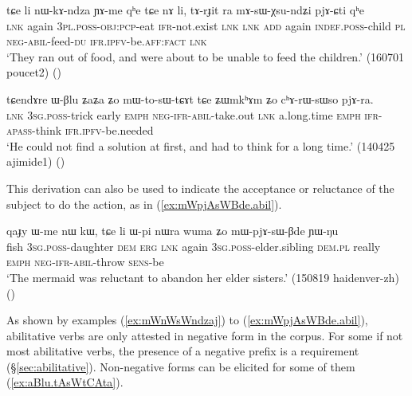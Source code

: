   \begin{exe}
\ex \label{ex:mAsWXsundZi}
 \gll   tɕe li nɯ-kɤ-ndza ɲɤ-me qʰe tɕe nɤ li, tɤ-rɟit ra mɤ-sɯ-χsu-ndʑi pjɤ-ɕti qʰe \\
 \textsc{lnk} again \textsc{3pl}.\textsc{poss}-\textsc{obj}:\textsc{pcp}-eat \textsc{ifr}-not.exist \textsc{lnk} \textsc{lnk} \textsc{add} again \textsc{indef}.\textsc{poss}-child \textsc{pl} \textsc{neg}-\textsc{abil}-feed-\textsc{du} \textsc{ifr}.\textsc{ipfv}-be.\textsc{aff}:\textsc{fact} \textsc{lnk} \\
\glt `They ran out of food, and were about to be unable to feed the children.' (160701 poucet2) ()
  \end{exe}
  

 \begin{exe}
\ex \label{ex:WBlu.mWtosWtCAt}
 \gll   tɕendɤre ɯ-βlu ʑaʑa ʑo mɯ-to-sɯ-tɕɤt tɕe ʑɯmkʰɤm ʑo cʰɤ-rɯ-sɯso pjɤ-ra. \\
\textsc{lnk}  \textsc{3sg}.\textsc{poss}-trick early \textsc{emph} \textsc{neg}-\textsc{ifr}-\textsc{abil}-take.out \textsc{lnk} a.long.time \textsc{emph} \textsc{ifr}-\textsc{apass}-think \textsc{ifr}.\textsc{ipfv}-be.needed \\
\glt `He could not find a solution at first, and had to think for a long time.' (140425 ajimide1)
()
 \end{exe}
 
 This derivation can also be used to indicate the acceptance or reluctance of the subject to do the action, as in (\ref{ex:mWpjAsWBde.abil}). 
 
\begin{exe}
\ex \label{ex:mWpjAsWBde.abil}
 \gll  qaɟy ɯ-me nɯ kɯ, tɕe li ɯ-pi nɯra wuma ʑo mɯ-pjɤ-sɯ-βde ɲɯ-ŋu  \\
 fish \textsc{3sg}.\textsc{poss}-daughter \textsc{dem} \textsc{erg} \textsc{lnk} again \textsc{3sg}.\textsc{poss}-elder.sibling \textsc{dem}.\textsc{pl} really \textsc{emph} \textsc{neg}-\textsc{ifr}-\textsc{abil}-throw \textsc{sens}-be \\
 \glt `The mermaid was reluctant to abandon her elder sisters.' (150819 haidenver-zh) ()
\end{exe}  
 
 As shown by examples (\ref{ex:mWnWsWndzaj}) to (\ref{ex:mWpjAsWBde.abil}), abilitative verbs are only attested in negative form in the corpus. For some if not most abilitative verbs, the presence of a negative prefix is a requirement (§\ref{sec:abilitative}). Non-negative forms can be elicited for some of them (\ref{ex:aBlu.tAsWtCAta}).

